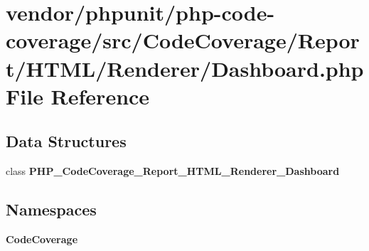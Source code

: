 \section{vendor/phpunit/php-\/code-\/coverage/src/\+Code\+Coverage/\+Report/\+H\+T\+M\+L/\+Renderer/\+Dashboard.php File Reference}
\label{_dashboard_8php}
\subsection*{Data Structures}
\begin{DoxyCompactItemize}
\item 
class {\bf P\+H\+P\+\_\+\+Code\+Coverage\+\_\+\+Report\+\_\+\+H\+T\+M\+L\+\_\+\+Renderer\+\_\+\+Dashboard}
\end{DoxyCompactItemize}
\subsection*{Namespaces}
\begin{DoxyCompactItemize}
\item 
 {\bf Code\+Coverage}
\end{DoxyCompactItemize}
